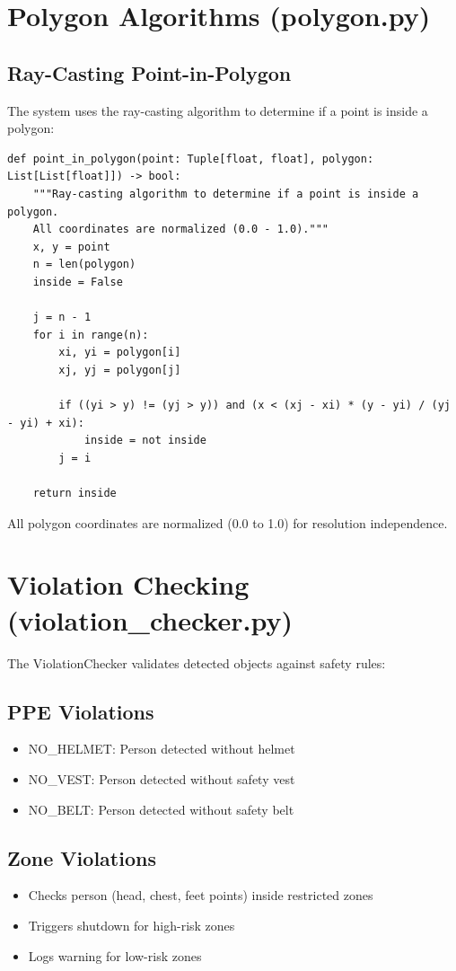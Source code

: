 \documentclass[12pt,a4paper,oneside]{book}
\begin{document}
\section{Polygon Algorithms (polygon.py)}

\subsection{Ray-Casting Point-in-Polygon}

The system uses the ray-casting algorithm to determine if a point is inside a polygon:

\begin{lstlisting}[style=pythonstyle]
def point_in_polygon(point: Tuple[float, float], polygon: List[List[float]]) -> bool:
    """Ray-casting algorithm to determine if a point is inside a polygon.
    All coordinates are normalized (0.0 - 1.0)."""
    x, y = point
    n = len(polygon)
    inside = False

    j = n - 1
    for i in range(n):
        xi, yi = polygon[i]
        xj, yj = polygon[j]

        if ((yi > y) != (yj > y)) and (x < (xj - xi) * (y - yi) / (yj - yi) + xi):
            inside = not inside
        j = i

    return inside
\end{lstlisting}

All polygon coordinates are normalized (0.0 to 1.0) for resolution independence.

\section{Violation Checking (violation\_checker.py)}

The ViolationChecker validates detected objects against safety rules:

\subsection{PPE Violations}
\begin{itemize}
    \item NO\_HELMET: Person detected without helmet
    \item NO\_VEST: Person detected without safety vest
    \item NO\_BELT: Person detected without safety belt
\end{itemize}

\subsection{Zone Violations}
\begin{itemize}
    \item Checks person (head, chest, feet points) inside restricted zones
    \item Triggers shutdown for high-risk zones
    \item Logs warning for low-risk zones
\end{itemize}
\end{document}

